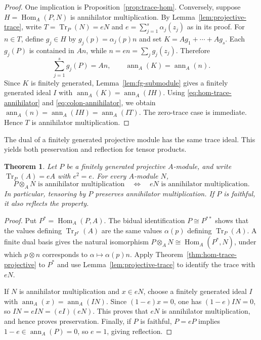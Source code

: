 \documentclass[11pt]{amsart}
\theoremstyle{plain}
\newtheorem{theorem}{Theorem}[section]
\theoremstyle{definition}
\theoremstyle{remark}
\DeclareMathOperator{\Hom}{Hom}
\DeclareMathOperator{\Tr}{Tr}
\newcommand{\ann}{\operatorname{ann}}
\numberwithin{equation}{section}
\begin{document}
\begin{proof}
One implication is Proposition~\ref{prop:trace-hom}. Conversely, suppose
$H=\Hom_A(P,N)$ is annihilator multiplication. By
Lemma~\ref{lem:projective-trace}, write $T=\Tr_P(N)=eN$ and
$e=\sum_{j=1}^s\alpha_j(z_j)$ as in its proof.
For $n\in T$, define $g_j\in H$ by $g_j(p)=\alpha_j(p)n$ and set
$K=Ag_1+\cdots+Ag_s$. Each $g_j(P)$ is contained in $An$, while
$n=en=\sum_j g_j(z_j)$. Therefore
\[
\sum_{j=1}^s g_j(P)=An,
\qquad
\ann_A(K)=\ann_A(n).
\]
Since $K$ is finitely generated, Lemma~\ref{lem:fg-submodule} gives a
finitely generated ideal $I$ with $\ann_A(K)=\ann_A(IH)$.
Using \eqref{eq:hom-trace-annihilator} and \eqref{eq:colon-annihilator},
we obtain $\ann_A(n)=\ann_A(IH)=\ann_A(IT)$.
The zero-trace case is immediate. Hence $T$ is annihilator multiplication.
\end{proof}

The dual of a finitely generated projective module has the same trace
ideal. This yields both preservation and reflection for tensor products.

\begin{theorem}\label{thm:tensor-trace}\label{prop:tensor-faithful-projective}
Let $P$ be a finitely generated projective $A$-module, and write
$\Tr_P(A)=eA$ with $e^2=e$. For every $A$-module $N$,
\[
 P\otimes_A N\text{ is annihilator multiplication}
 \quad\iff\quad eN\text{ is annihilator multiplication}.
\]
In particular, tensoring by $P$ preserves annihilator multiplication.
If $P$ is faithful, it also reflects the property.
\end{theorem}

\begin{proof}
Put $P^*=\Hom_A(P,A)$. The bidual identification $P\cong P^{**}$
shows that the values defining $\Tr_{P^*}(A)$ are the same values
$\alpha(p)$ defining $\Tr_P(A)$.
A finite dual basis gives the natural isomorphism
$P\otimes_A N\cong\Hom_A(P^*,N)$, under which
$p\otimes n$ corresponds to $\alpha\mapsto\alpha(p)n$.
Apply Theorem~\ref{thm:hom-trace-projective} to $P^*$ and use
Lemma~\ref{lem:projective-trace} to identify the trace with $eN$.

If $N$ is annihilator multiplication and $x\in eN$, choose a finitely
generated ideal $I$ with $\ann_A(x)=\ann_A(IN)$.
Since $(1-e)x=0$, one has $(1-e)IN=0$, so
$IN=eIN=(eI)(eN)$. This proves that $eN$ is annihilator
multiplication, and hence proves preservation.
Finally, if $P$ is faithful, $P=eP$ implies $1-e\in\ann_A(P)=0$,
so $e=1$, giving reflection.
\end{proof}
\end{document}
